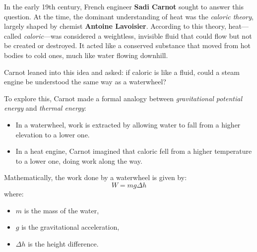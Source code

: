 In the early 19th century, French engineer \textbf{Sadi Carnot} sought to answer this question. At the time, the dominant understanding of heat was the \emph{caloric theory}, largely shaped by chemist \textbf{Antoine Lavoisier}. According to this theory, heat—called \emph{caloric}—was considered a weightless, invisible fluid that could flow but not be created or destroyed. It acted like a conserved substance that moved from hot bodies to cold ones, much like water flowing downhill.

Carnot leaned into this idea and asked: if caloric is like a fluid, could a steam engine be understood the same way as a waterwheel?

To explore this, Carnot made a formal analogy between \emph{gravitational potential energy} and \emph{thermal energy}:

\begin{itemize}
  \item In a waterwheel, work is extracted by allowing water to fall from a higher elevation to a lower one.
  \item In a heat engine, Carnot imagined that caloric fell from a higher temperature to a lower one, doing work along the way.
\end{itemize}

Mathematically, the work done by a waterwheel is given by:
\[
W = mg \Delta h
\]
where:
\begin{itemize}
  \item \( m \) is the mass of the water,
  \item \( g \) is the gravitational acceleration,
  \item \( \Delta h \) is the height difference.
\end{itemize}



